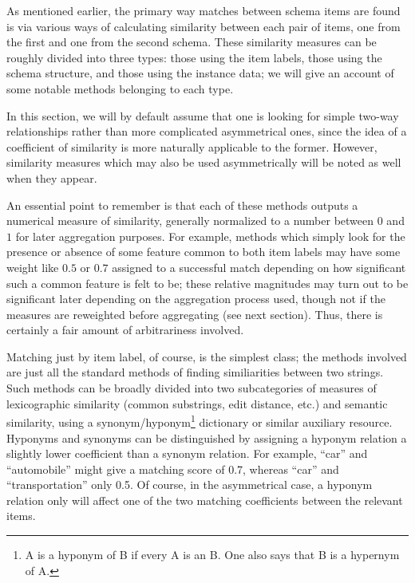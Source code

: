 \documentclass{article}
\theoremstyle{definition}
\theoremstyle{remark}
\begin{document}
As mentioned earlier, the primary way matches between schema items are found is via various ways of calculating similarity between each pair of items, one from the first and one from the second schema. These similarity measures can be roughly divided into three types: those using the item labels, those using the schema structure, and those using the instance data; we will give an account of some notable methods belonging to each type. 

In this section, we will by default assume that one is looking for simple two-way relationships rather than more complicated asymmetrical ones, since the idea of a coefficient of similarity is more naturally applicable to the former. However, similarity measures which may also be used asymmetrically will be noted as well when they appear.

An essential point to remember is that each of these methods outputs a numerical measure of similarity, generally normalized to a number between $0$ and $1$ for later aggregation purposes. For example, methods which simply look for the presence or absence of some feature common to both item labels may have some weight like $0.5$ or $0.7$ assigned to a successful match depending on how significant such a common feature is felt to be; these relative magnitudes may turn out to be significant later depending on the aggregation process used, though not if the measures are reweighted before aggregating (see next section). Thus, there is certainly a fair amount of arbitrariness involved.

Matching just by item label, of course, is the simplest class; the methods involved are just all the standard methods of finding similiarities between two strings. Such methods can be broadly divided into two subcategories of measures of lexicographic similarity (common substrings, edit distance, etc.) and semantic similarity, using a synonym/hyponym\footnote{A is a hyponym of B if every A is an B. One also says that B is a hypernym of A.} dictionary or similar auxiliary resource. Hyponyms and synonyms can be distinguished by assigning a hyponym relation a slightly lower coefficient than a synonym relation. For example, ``car'' and ``automobile'' might give a matching score of 0.7, whereas ``car'' and ``transportation'' only 0.5. Of course, in the asymmetrical case, a hyponym relation only will affect one of the two matching coefficients between the relevant items. 
\end{document}
